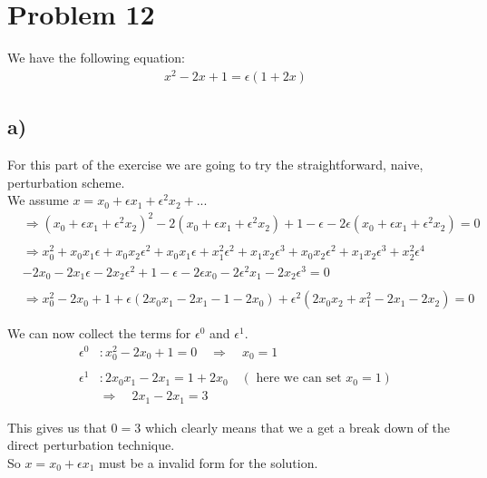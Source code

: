 \documentclass[english,a4paper,12pt]{article}
\begin{document}
\newpage

\section*{Problem 12}
We have the following equation:\\
\begin{align*}
x^2 - 2x + 1 = \epsilon (1 + 2x)
\end{align*}
\subsection*{a)}
For this part of the exercise we are going to try the straightforward, naive, perturbation scheme.\\
We assume $x=x_0 + \epsilon x_1 + \epsilon^2 x_2 + ...$\\

\begin{align*}
&\Rightarrow (x_0 + \epsilon x_1 + \epsilon^2 x_2)^2 -2(x_0 + \epsilon x_1 + \epsilon^2 x_2) + 1 -\epsilon -2\epsilon(x_0 + \epsilon x_1 + \epsilon^2 x_2)=0\\\\
&\Rightarrow x_0^2 + x_0 x_1 \epsilon + x_0 x_2 \epsilon^2 + x_0 x_1 \epsilon + x_1^2 \epsilon^2 + x_1 x_2 \epsilon^3 + x_0 x_2 \epsilon^2 + x_1 x_2 \epsilon^3 + x_2^2 \epsilon^4\\ 
&-2x_0 -2x_1 \epsilon -2 x_2 \epsilon^2 + 1 -\epsilon-2 \epsilon x_0 - 2 \epsilon^2 x_1 -2 x_2 \epsilon^3 = 0\\\\
&\Rightarrow x_0^2 -2x_0 +1 + \epsilon(2x_0 x_1 -2x_1 -1 -2x_0) + \epsilon^2(2x_0x_2 + x_1^2 -2x_1 -2x_2)=0
\end{align*}

We can now collect the terms for $\epsilon^0$ and $\epsilon^1$.\\

\begin{align*}
\epsilon^0 &: x_0^2 -2x_0 +1 = 0 \quad \Rightarrow \quad x_0 = 1\\\\
\epsilon^1 &: 2x_0 x_1 - 2x_1 = 1 + 2x_0 \quad (\text{ here we can set $x_0 =1$})\\
&\Rightarrow \quad 2x_1 - 2 x_1 = 3
\end{align*}

This gives us that $0 = 3$ which clearly means that we a get a break down of the direct perturbation technique.\\
So $x = x_0 + \epsilon x_1$ must be a invalid form for the solution.
\end{document}

